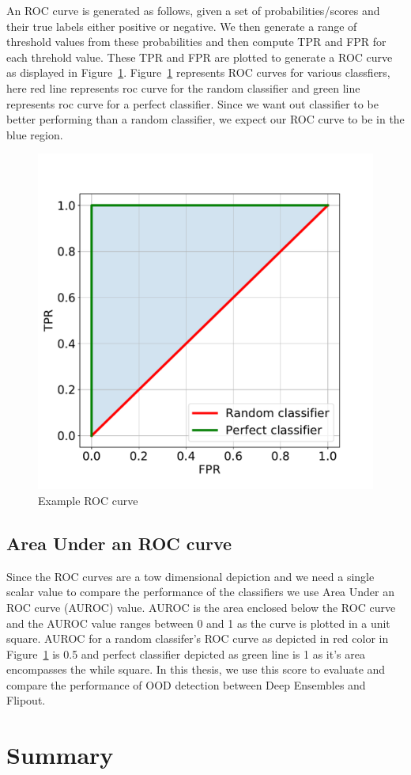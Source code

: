 An ROC curve is generated as follows, given a set of probabilities/scores and their true labels either positive or negative.
We then generate a range of threshold values from these probabilities and then compute TPR and FPR for each threhold value.
These TPR and FPR are plotted to generate a ROC curve as displayed in Figure~\ref{fig:ROC_curve_example}. 
Figure~\ref{fig:ROC_curve_example} represents ROC curves for various classfiers, here red line represents roc curve for the random classifier and green line represents roc curve for a perfect classifier.
Since we want out classifier to be better performing than a random classifier, we expect our ROC curve to be in the blue region.
\begin{figure}[!ht]
    \centering
    \includegraphics[scale=0.35]{images/ROC_curve_example.pdf}
    \caption{Example ROC curve}
    \label{fig:ROC_curve_example}
\end{figure}

\subsection{Area Under an ROC curve}
Since the ROC curves are a tow dimensional depiction and we need a single scalar value to compare the performance of the classifiers we use Area Under an ROC curve (AUROC) value.
AUROC is the area enclosed below the ROC curve and the AUROC value ranges between 0 and 1 as the curve is plotted in a unit square.
AUROC for a random classifer's ROC curve as depicted in red color in Figure~\ref{fig:ROC_curve_example} is 0.5 and perfect classifier depicted as green line is 1 as it's area encompasses the while square.
In this thesis, we use this score to evaluate and  compare the performance of OOD detection between Deep Ensembles and Flipout.

\section{Summary}

